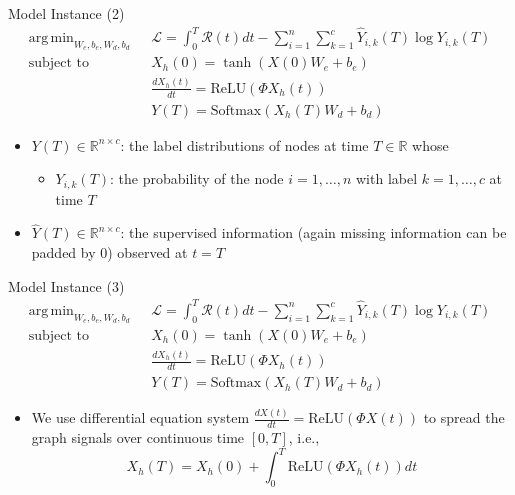 \documentclass{beamer}
\DeclareMathOperator*{\argmin}{arg\,min}
\begin{document}
\begin{frame}{Model Instance (2)}\[
\begin{split}
\argmin_{W_e,b_e,W_d,b_d}\text{ }&\mathcal{L}=\int_0^T\mathcal{R}(t)dt-\sum_{i=1}^n\sum_{k=1}^c\hat{Y}_{i,k}(T)\log Y_{i,k}(T)\\
\text{subject to }&X_h(0)=\tanh(X(0)W_e+b_e)\\
&\frac{dX_h(t)}{dt}=\text{ReLU}(\Phi X_h(t))\\
&Y(T)=\text{Softmax}(X_h(T)W_d+b_d)
\end{split}
\]
\begin{itemize}
\item $Y(T)\in\mathbb{R}^{n\times c}$: the label distributions of nodes at time $T\in\mathbb{R}$ whose 
\begin{itemize}
\item $Y_{i,k}(T)$: the probability of the node $i=1,\dots,n$ with label $k=1,\dots,c$ at time $T$
\end{itemize}
\item $\hat{Y}(T)\in\mathbb{R}^{n\times c}$: the supervised information (again missing information can be padded by $0$) observed at $t=T$
\end{itemize}
\end{frame}

\begin{frame}{Model Instance (3)}\[
\begin{split}
\argmin_{W_e,b_e,W_d,b_d}\text{ }&\mathcal{L}=\int_0^T\mathcal{R}(t)dt-\sum_{i=1}^n\sum_{k=1}^c\hat{Y}_{i,k}(T)\log Y_{i,k}(T)\\
\text{subject to }&X_h(0)=\tanh(X(0)W_e+b_e)\\
&\frac{dX_h(t)}{dt}=\text{ReLU}(\Phi X_h(t))\\
&Y(T)=\text{Softmax}(X_h(T)W_d+b_d)
\end{split}
\]
\begin{itemize}
\item We use differential equation system $\frac{dX(t)}{dt}=\text{ReLU}(\Phi X(t))$ to spread the graph signals over continuous time $[0,T]$, i.e.,\[
X_h(T)=X_h(0)+\int_0^T\text{ReLU}(\Phi X_h(t))dt
\]
\end{itemize}
\end{frame}
\end{document}
